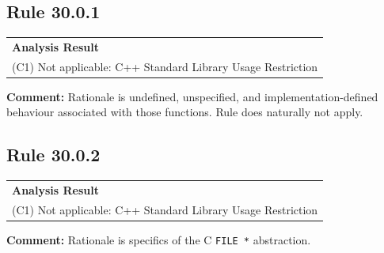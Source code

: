 \subsection*{Rule 30.0.1}
\begin{longtable}{p{13cm}}
\textbf{Analysis Result} \\
(C1) Not applicable: C++ Standard Library Usage Restriction \\
\end{longtable}
\textbf{Comment:} Rationale is undefined, unspecified, and implementation-defined behaviour associated with those functions. Rule does naturally not apply. \\
\subsection*{Rule 30.0.2}
\begin{longtable}{p{13cm}}
\textbf{Analysis Result} \\
(C1) Not applicable: C++ Standard Library Usage Restriction \\
\end{longtable}
\textbf{Comment:} Rationale is specifics of the C \texttt{FILE *} abstraction. \\
